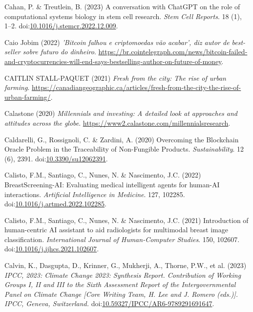 \documentclass[
  letterpaper,
  DIV=11,
  numbers=noendperiod]{scrartcl}
\newlength{\cslhangindent}
\newenvironment{CSLReferences}[2] %
 {\begin{list}{}{%
  \setlength{\itemindent}{0pt}
  \setlength{\leftmargin}{0pt}
  \setlength{\parsep}{0pt}
  \ifodd #1
   \setlength{\leftmargin}{\cslhangindent}
   \setlength{\itemindent}{-1\cslhangindent}
  \fi
  \setlength{\itemsep}{#2\baselineskip}}}
 {\end{list}}
\begin{document}
\begin{CSLReferences}{0}{1}
Cahan, P. \& Treutlein, B. (2023) A conversation with {ChatGPT} on the
role of computational systems biology in stem cell research. \emph{Stem
Cell Reports}. 18 (1), 1--2.
doi:\href{https://doi.org/10.1016/j.stemcr.2022.12.009}{10.1016/j.stemcr.2022.12.009}.

Caio Jobim (2022) \emph{'{Bitcoin} falhou e criptomoedas v{ã}o acabar',
diz autor de best-seller sobre futuro do dinheiro}.
\url{https://br.cointelegraph.com/news/bitcoin-failed-and-cryptocurrencies-will-end-says-bestselling-author-on-future-of-money}.

CAITLIN STALL-PAQUET (2021) \emph{Fresh from the city: {The} rise of
urban farming}.
\url{https://canadiangeographic.ca/articles/fresh-from-the-city-the-rise-of-urban-farming/}.

Calastone (2020) \emph{Millennials and investing: A detailed look at
approaches and attitudes across the globe}.
\url{https://www2.calastone.com/millennialsresearch}.

Caldarelli, G., Rossignoli, C. \& Zardini, A. (2020) Overcoming the
{Blockchain Oracle Problem} in the {Traceability} of {Non-Fungible
Products}. \emph{Sustainability}. 12 (6), 2391.
doi:\href{https://doi.org/10.3390/su12062391}{10.3390/su12062391}.

Calisto, F.M., Santiago, C., Nunes, N. \& Nascimento, J.C. (2022)
{BreastScreening-AI}: {Evaluating} medical intelligent agents for
human-{AI} interactions. \emph{Artificial Intelligence in Medicine}.
127, 102285.
doi:\href{https://doi.org/10.1016/j.artmed.2022.102285}{10.1016/j.artmed.2022.102285}.

Calisto, F.M., Santiago, C., Nunes, N. \& Nascimento, J.C. (2021)
Introduction of human-centric {AI} assistant to aid radiologists for
multimodal breast image classification. \emph{International Journal of
Human-Computer Studies}. 150, 102607.
doi:\href{https://doi.org/10.1016/j.ijhcs.2021.102607}{10.1016/j.ijhcs.2021.102607}.

Calvin, K., Dasgupta, D., Krinner, G., Mukherji, A., Thorne, P.W., et
al. (2023) \emph{{IPCC}, 2023: {Climate Change} 2023: {Synthesis
Report}. {Contribution} of {Working Groups I}, {II} and {III} to the
{Sixth Assessment Report} of the {Intergovernmental Panel} on {Climate
Change} {[}{Core Writing Team}, {H}. {Lee} and {J}. {Romero} (eds.){]}.
{IPCC}, {Geneva}, {Switzerland}.}
doi:\href{https://doi.org/10.59327/IPCC/AR6-9789291691647}{10.59327/IPCC/AR6-9789291691647}.


\end{CSLReferences}
\end{document}
